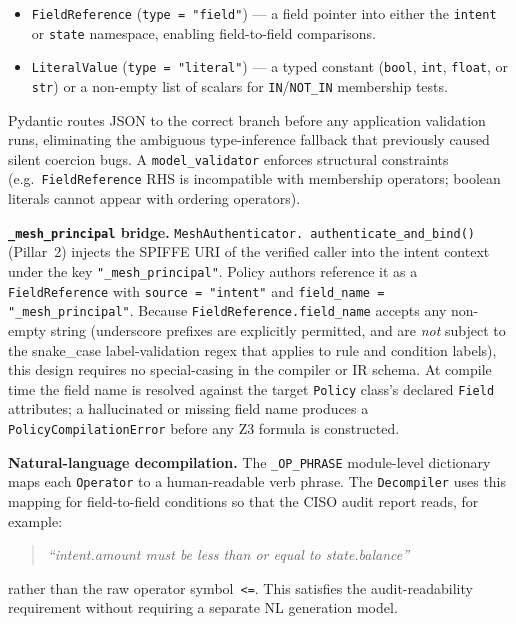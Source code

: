 \documentclass[12pt,a4paper,oneside]{report}
\newcommand{\code}[1]{\texttt{#1}}           %
\begin{document}
\begin{itemize}
  \item \code{FieldReference} (\code{type = "field"}) --- a field pointer
    into either the \code{intent} or \code{state} namespace, enabling
    field-to-field comparisons.
  \item \code{LiteralValue} (\code{type = "literal"}) --- a typed constant
    (\code{bool}, \code{int}, \code{float}, or \code{str}) or a non-empty
    list of scalars for \code{IN}/\code{NOT\_IN} membership tests.
\end{itemize}

Pydantic routes JSON to the correct branch before any application
validation runs, eliminating the ambiguous type-inference fallback that
previously caused silent coercion bugs.  A \code{model\_validator} enforces
structural constraints (e.g.\ \code{FieldReference} RHS is incompatible with
membership operators; boolean literals cannot appear with ordering operators).

\textbf{\code{\_mesh\_principal} bridge.}  \code{MeshAuthenticator.\allowbreak
authenticate\_and\_bind()} (Pillar~2) injects the SPIFFE URI of the verified
caller into the intent context under the key \code{"\_mesh\_principal"}.
Policy authors reference it as a \code{FieldReference} with
\code{source = "intent"} and \code{field\_name = "\_mesh\_principal"}.
Because \code{FieldReference.field\_name} accepts any non-empty string
(underscore prefixes are explicitly permitted, and are \emph{not} subject to
the snake\_case label-validation regex that applies to rule and condition
labels), this design requires no special-casing in the compiler or IR schema.
At compile time the field name is resolved against the target \code{Policy}
class's declared \code{Field} attributes; a hallucinated or missing field name
produces a \code{PolicyCompilationError} before any Z3 formula is constructed.

\textbf{Natural-language decompilation.}  The \code{\_OP\_PHRASE} module-level
dictionary maps each \code{Operator} to a human-readable verb phrase.  The
\code{Decompiler} uses this mapping for field-to-field conditions so that the
CISO audit report reads, for example:

\begin{quote}
\textit{``intent.amount must be less than or equal to state.balance''}
\end{quote}

\noindent rather than the raw operator symbol~\code{<=}.  This satisfies the
audit-readability requirement without requiring a separate NL generation model.
\end{document}
